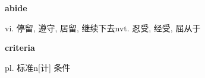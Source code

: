 \documentclass[12pt]{book}
\begin{document}
\textbf{abide}

vi. 停留, 遵守, 居留, 继续下去nvt. 忍受, 经受, 屈从于

\vspace{12pt}

\textbf{criteria}

pl. 标准n[计] 条件
\end{document}
